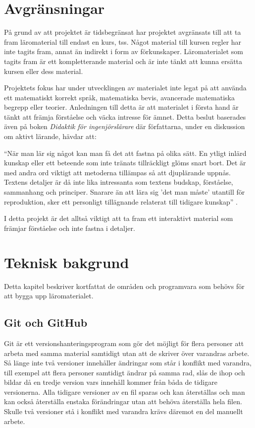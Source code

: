 \documentclass[12pt,a4paper,twoside,openright]{article}
\begin{document}
\newpage

\section{Avgränsningar}
\label{sec:avgrans}
På grund av att projektet är tidsbegränsat har projektet avgränsats
till att ta fram läromaterial till endast en kurs,
\gls{tss}. Något material till kursen \gls{regler} har inte tagits fram,
annat än indirekt i form av förkunskaper. Läromaterialet som tagits
fram är ett kompletterande
material och är inte tänkt att kunna ersätta kursen eller dess
material.

Projektets fokus har under utvecklingen av materialet inte legat på
att använda ett matematiskt korrekt språk, matematiska bevis,
avancerade matematiska begrepp eller teorier. Anledningen till detta
är att materialet i första hand är tänkt att främja förståelse och
väcka intresse för ämnet. Detta beslut baserades även på boken
\textit{Didaktik för ingenjörslärare} där författarna, under en
diskussion om aktivt lärande, hävdar att:
\begin{displayquote}
``När man lär sig något kan
man få det att fastna på olika sätt. En ytligt inlärd kunskap eller
ett beteende som inte tränats tillräckligt glöms snart bort. Det är
med andra ord viktigt att metoderna tillämpas så att djuplärande
uppnås. Textens detaljer är då inte lika intressanta som textens
budskap, förståelse, sammanhang och principer. Snarare än att lära sig
'det man måste' utantill för reproduktion, sker ett personligt
tillägnande relaterat till tidigare kunskap''
\cite[s~236]{didaktik_for_ingenjorslarare}.
\end{displayquote}
I detta projekt är det alltså viktigt att ta fram ett interaktivt
material som främjar förståelse och inte fastna i detaljer.

\newpage

\section{Teknisk bakgrund}
Detta kapitel beskriver kortfattat de områden och programvara som
behövs för att bygga upp läromaterialet.

\subsection{Git och GitHub}
\gls{Git} är ett versionshanteringsprogram som gör det möjligt för
flera personer att arbeta med samma material samtidigt utan att de
skriver över varandras arbete. Så länge inte två versioner innehåller
ändringar som står i konflikt med varandra, till exempel att flera
personer samtidigt ändrar på samma rad, slås de ihop och bildar då en
tredje version vars innehåll kommer från båda de tidigare
versionerna. Alla tidigare versioner av en fil sparas och kan
återställas och man kan också återställa enstaka förändringar utan att
behöva återställa hela filen. Skulle två versioner stå i konflikt med
varandra krävs däremot en del manuellt arbete.
\end{document}
